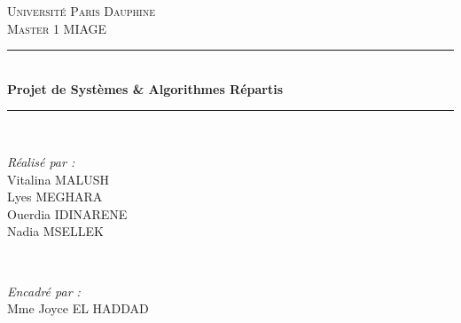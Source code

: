 \documentclass[11pt]{article}
\begin{document}

\begin{titlepage}
	\newcommand{\HRule}{\rule{\linewidth}{0.5mm}} 
	
	\center
	
	
	\textsc{\LARGE Université Paris Dauphine}\\[1.5cm] 
	
	\textsc{\Large Master 1 MIAGE}\\[0.5cm] 
	

	
	
	\HRule\\[0.4cm]
	
	{\huge\bfseries Projet de Systèmes \& Algorithmes Répartis}\\[0.4cm]
	
	\HRule\\[1.5cm]
	
	
	\begin{minipage}{0.4\textwidth}
		\begin{flushleft}
			\large
			\textit{Réalisé par :}\\
			Vitalina \textsc{MALUSH}\\ 
			Lyes \textsc{MEGHARA}\\ 
			Ouerdia \textsc{IDINARENE}\\ 
			Nadia \textsc{MSELLEK}\\ 
		\end{flushleft}
	\end{minipage}
	~
	\begin{minipage}{0.4\textwidth}
		\begin{flushright}
			\large
			\textit{Encadré par :}\\
			Mme Joyce \textsc{EL HADDAD}%

		\end{flushright}
	\end{minipage}
	


\end{titlepage}
\end{document}
